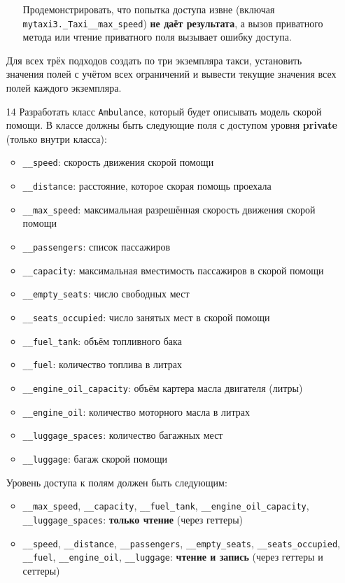 \begin{enumerate}
\begin{enumerate}
    Продемонстрировать, что попытка доступа извне (включая \texttt{mytaxi3.\_Taxi\_\_max\_speed}) \textbf{не даёт результата}, а вызов приватного метода или чтение приватного поля вызывает ошибку доступа.
\end{enumerate}
Для всех трёх подходов создать по три экземпляра такси, установить значения полей с учётом всех ограничений и вывести текущие значения всех полей каждого экземпляра.
\item[14] Разработать класс \texttt{Ambulance}, который будет описывать модель скорой помощи. В классе должны быть следующие поля с доступом уровня \textbf{private} (только внутри класса):
\begin{itemize}
    \item \texttt{\_\_speed}: скорость движения скорой помощи  
    \item \texttt{\_\_distance}: расстояние, которое скорая помощь проехала  
    \item \texttt{\_\_max\_speed}: максимальная разрешённая скорость движения скорой помощи  
    \item \texttt{\_\_passengers}: список пассажиров  
    \item \texttt{\_\_capacity}: максимальная вместимость пассажиров в скорой помощи  
    \item \texttt{\_\_empty\_seats}: число свободных мест  
    \item \texttt{\_\_seats\_occupied}: число занятых мест в скорой помощи  
    \item \texttt{\_\_fuel\_tank}: объём топливного бака  
    \item \texttt{\_\_fuel}: количество топлива в литрах  
    \item \texttt{\_\_engine\_oil\_capacity}: объём картера масла двигателя (литры)  
    \item \texttt{\_\_engine\_oil}: количество моторного масла в литрах  
    \item \texttt{\_\_luggage\_spaces}: количество багажных мест  
    \item \texttt{\_\_luggage}: багаж скорой помощи  
\end{itemize}
Уровень доступа к полям должен быть следующим:
\begin{itemize}
    \item \texttt{\_\_max\_speed}, \texttt{\_\_capacity}, \texttt{\_\_fuel\_tank}, \texttt{\_\_engine\_oil\_capacity}, \texttt{\_\_luggage\_spaces}: \textbf{только чтение} (через геттеры)  
    \item \texttt{\_\_speed}, \texttt{\_\_distance}, \texttt{\_\_passengers}, \texttt{\_\_empty\_seats}, \texttt{\_\_seats\_occupied}, \texttt{\_\_fuel}, \texttt{\_\_engine\_oil}, \texttt{\_\_luggage}: \textbf{чтение и запись} (через геттеры и сеттеры)

\end{itemize}
\end{enumerate}
